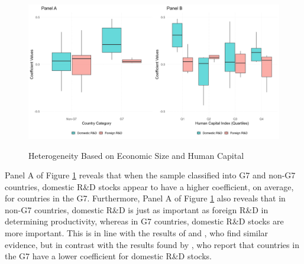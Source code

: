 \documentclass[12pt]{article}
\begin{document}
\begin{figure}[h!]
    \centering
    \doublespacing
        \caption{Heterogeneity Based on Economic Size and Human Capital}
    \includegraphics[width=1\linewidth]{boxplots.png}
    \label{fig: boxplots}
\end{figure}

Panel A of Figure \ref{fig: boxplots} reveals that when the sample classified into G7 and non-G7 countries, domestic R\&D stocks appear to have a higher coefficient, on average, for countries in the G7. Furthermore, Panel A of Figure \ref{fig: boxplots} also reveals that in non-G7 countries, domestic R\&D is just as important as foreign R\&D in determining productivity, whereas in G7 countries, domestic R\&D stocks are more important. This is in line with the results of \citet{Coe1995} and \citet{Engelbrecht1997}, who find similar evidence, but in contrast with the results found by \citet{Coe2009}, who report that countries in the G7 have a lower coefficient for domestic R\&D stocks.
\end{document}
